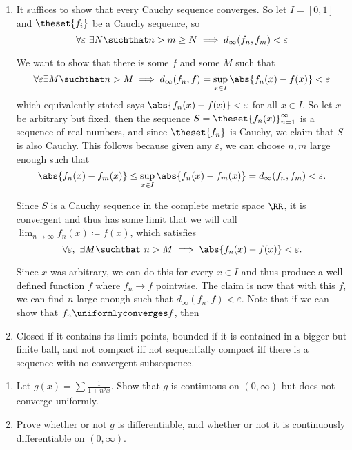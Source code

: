 \begin{solution}
\begin{enumerate}
  \item It suffices to show that every Cauchy sequence converges. So let $I = [0,1]$ and $\theset{f_i}$ be a Cauchy sequence, so
  $$
  \forall\varepsilon ~\exists N \suchthat n > m \geq N \implies d_\infty(f_n, f_m) < \varepsilon
  $$

  We want to show that there is some $f$ and some $M$ such that
  $$
  \forall\varepsilon \exists M \suchthat n > M \implies d_\infty(f_n, f)  = \sup_{x\in I} \abs{f_n(x) - f(x)} < \varepsilon
  $$
  which equivalently stated says $\abs{f_n(x) - f(x)} < \varepsilon$ for all $x\in I$. So let $x$ be arbitrary but fixed, then the sequence $S = \theset{f_n(x)}_{n=1}^\infty$ is a sequence of real numbers, and since $\theset{f_n}$ is Cauchy, we claim that $S$ is also Cauchy. This follows because given any $\varepsilon$, we can choose $n,m$ large enough such that
  $$
  \abs{f_n(x) - f_m(x)} \leq \sup_{x\in I} \abs{f_n(x) - f_m(x)} = d_\infty(f_n, f_m) < \varepsilon.
  $$


  Since $S$ is a Cauchy sequence in the complete metric space $\RR$, it is convergent and thus has some limit that we will call $\lim_{n\to\infty} f_n(x) \coloneqq f(x)$, which satisfies
  $$
  \forall \varepsilon,~ \exists M \suchthat ~n > M \implies \abs{f_n(x) - f(x)} < \varepsilon.
  $$

  Since $x$ was arbitrary, we can do this for every $x\in I$ and thus produce a well-defined function $f$ where $f_n \to f$ pointwise. The claim is now that with this $f$, we can find $n$ large enough such that $d_\infty(f_n, f)< \varepsilon$. Note that if we can show that $f_n \uniformlyconverges f$, then

  \item Closed if it contains its limit points, bounded if it is contained in a bigger but finite ball, and not compact iff not sequentially compact iff there is a sequence with no convergent subsequence.
\end{enumerate}
\end{solution}


\begin{problem}
\begin{enumerate}
  \item Let $g(x) = \sum \frac 1 {1 + n^2 x}$. Show that $g$ is continuous on $(0, \infty)$ but does not converge uniformly.
  \item Prove whether or not $g$ is differentiable, and whether or not it is continuously differentiable on $(0, \infty)$.
\end{enumerate}
\end{problem}


